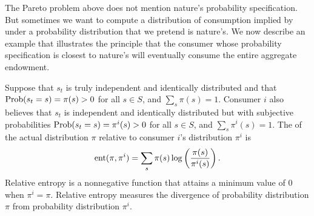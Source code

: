\noindent
The  Pareto problem above does not mention nature's probability specification.
 But sometimes we want to compute
a distribution of consumption implied by
 under a probability distribution that we pretend is nature's.
We now describe an  example that illustrates the principle that
 the consumer whose probability specification is closest to nature's
will eventually consume the entire aggregate endowment.

 Suppose that $s_t$ is
truly independent and identically distributed and that
${\rm Prob}(s_t = s) = \pi(s)>0$ for all $s\in S$,
and $\sum_s \pi(s)=1$.
Consumer $i$ also believes that $s_t$ is
independent and identically distributed but with
subjective probabilities ${\rm Prob}(s_t = s) = \pi^i(s)>0$
for all $s\in S$, and $\sum_s \pi^i(s)=1$.
The  of the actual distribution $\pi$
relative to consumer $i$'s distribution $\pi^i$ is
$$ {\rm ent}(\pi, \pi^i) = \sum_s \pi(s)
\log \left({\frac{\pi(s)}{\pi^i(s)}}\right).
$$
Relative entropy is a nonnegative function that attains
a minimum value of 0 when $\pi^i=\pi$.
Relative entropy measures the divergence of probability distribution $\pi$ from probability
 distribution $\pi^i$. %

